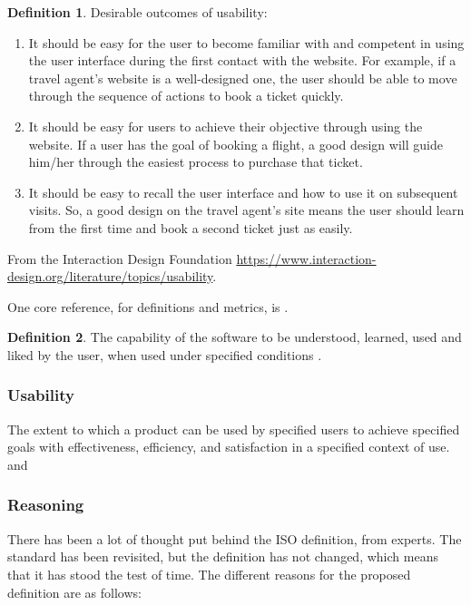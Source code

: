 \documentclass[letterpaper, cleveref]{lipics-v2019}
\theoremstyle{definition}
\newtheorem{defn}{Definition}
\begin{document}
\begin{defn}
Desirable outcomes of usability:
\begin{enumerate}
\item It should be easy for the user to become familiar with and competent in
using the user interface during the first contact with the website. For
example, if a travel agent's website is a well-designed one, the user should
be able to move through the sequence of actions to book a ticket quickly.
\item It should be easy for users to achieve their objective through using the
  website. If a user has the goal of booking a flight, a good design will guide
  him/her through the easiest process to purchase that ticket.
\item It should be easy to recall the user interface and how to use it on
  subsequent visits. So, a good design on the travel agent's site means the user
  should learn from the first time and book a second ticket just as easily.
\end{enumerate}
From the Interaction Design Foundation
\url{https://www.interaction-design.org/literature/topics/usability}.
\end{defn}

One core reference, for definitions and metrics, is
\citet{bevan1995measuring}.

\begin{defn}
  The capability of the software to be understood, learned, used and liked by
  the user, when used under specified conditions \cite{ISO9126}.
\end{defn}

\begin{mybox}
\subsubsection*{Usability}
The extent to which a product can be used by specified users to achieve
specified goals with effectiveness, efficiency, and satisfaction in a specified
context of use. \cite{ISO16982:2002} and \cite{ISO9241:11}
\end{mybox}

\subsubsection*{Reasoning}

There has been a lot of thought put behind the ISO definition, from experts. The
standard has been revisited, but the definition has not changed, which means
that it has stood the test of time.  The different reasons for the proposed
definition are as follows:
\end{document}
